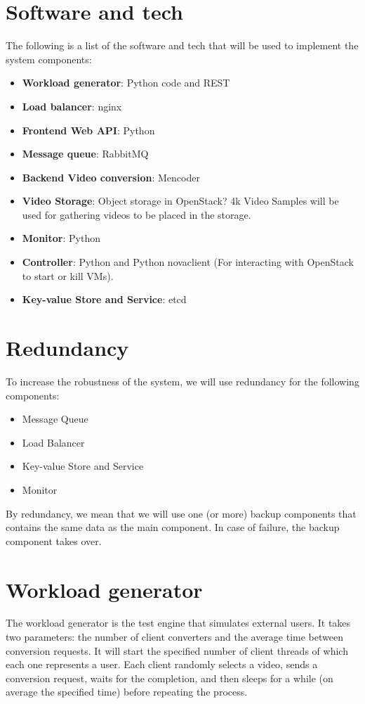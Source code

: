 \documentclass[a4paper, 10pt, english]{article}
\begin{document}
\section{Software and tech}
The following is a list of the software and tech that will be used to implement the system components:
\begin{itemize}
	\item \textbf{Workload generator}: Python code and REST
	\item \textbf{Load balancer}: nginx
	\item \textbf{Frontend Web API}: Python
	\item \textbf{Message queue}: RabbitMQ
	\item \textbf{Backend Video conversion}: Mencoder
	\item \textbf{Video Storage}: Object storage in OpenStack? 4k Video Samples will be used for gathering videos to be placed in the storage.
	\item \textbf{Monitor}: Python
	\item \textbf{Controller}: Python and Python novaclient (For interacting with OpenStack to start or kill VMs).
	\item \textbf{Key-value Store and Service}: etcd
\end{itemize}

\section{Redundancy}
To increase the robustness of the system, we will use redundancy for the following components:
\begin{itemize}
	\item Message Queue
	\item Load Balancer
	\item Key-value Store and Service
	\item Monitor
\end{itemize}
By redundancy, we mean that we will use one (or more) backup components that contains the same data as the main component. In case of failure, the backup component takes over.
\section{Workload generator} \label{sec:WG}
The workload generator is the test engine that simulates external users. It takes two parameters: the number of client converters and the average time between conversion requests. It will start the specified number of client threads of which each one represents a user. Each client randomly selects a video, sends a conversion request, waits for the completion, and then sleeps for a while (on average the specified time) before repeating the process.
\end{document}

